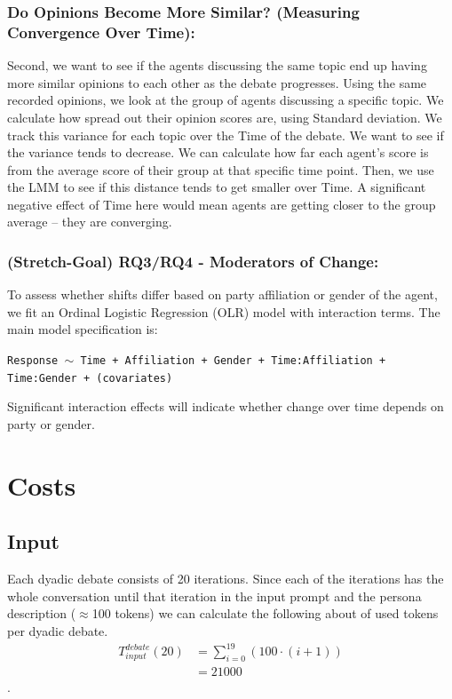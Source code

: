 \documentclass[12pt]{article}
\begin{document}
\begin{multicols}{2}
\subsubsection{Do Opinions Become More Similar? (Measuring Convergence Over Time):}

Second, we want to see if the agents discussing the same topic end up having more similar opinions to each other as the debate progresses. Using the same recorded opinions, we look at the group of agents discussing a specific topic. We calculate how spread out their opinion scores are, using Standard deviation. We track this variance for each topic over the Time of the debate. We want to see if the variance tends to decrease. We can calculate how far each agent's score is from the average score of their group at that specific time point. Then, we use the LMM to see if this distance tends to get smaller over Time. A significant negative effect of Time here would mean agents are getting closer to the group average – they are converging.

\subsubsection{(Stretch-Goal) RQ3/RQ4 - Moderators of Change:}
To assess whether shifts differ based on party affiliation or gender of the agent, we fit an Ordinal Logistic Regression (OLR) model with interaction terms. The main model specification is:

\texttt{Response $\sim$ Time + Affiliation + Gender + Time:Affiliation + Time:Gender + (covariates)}

Significant interaction effects will indicate whether change over time depends on party or gender.






\appendix




\section{Costs}

\subsection{Input}


Each dyadic debate consists of 20 iterations. Since each of the iterations has the whole conversation until that iteration in the input prompt and the persona description ($\approx$100 tokens) we can calculate the following about of used tokens per dyadic debate. 
\begin{align*}
    T^{debate}_{input}(20) &= \sum_{i=0}^{19} (100 \cdot (i+1)) \\ %
    &= 21000
\end{align*}.


\end{multicols}
\end{document}
